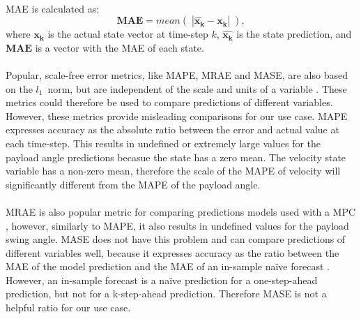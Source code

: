         \paragraph{}
        MAE is calculated as:
        \begin{equation}
            \bm{MAE} = mean \left( \phantom{.} \left\lvert \bm{\hat{x_k}} - \bm{x_k} \right\rvert \phantom{.} \right),
        \end{equation}
        where 
        $\bm{x_k}$ is the actual state vector at time-step $k$, 
        $\bm{\hat{x_k}}$ is the state prediction, 
        and 
        $\bm{MAE}$ is a vector with the MAE of each state.
        
        \paragraph{}
        Popular, scale-free error metrics, like MAPE, MRAE and MASE, are also based on the $l_1$~norm,
        but are independent of the scale and units of a variable \cite{Hyndman2006}.
        These metrics could therefore be used to compare predictions of different variables.
        However, these metrics provide misleading comparisons for our use case.
        MAPE expresses accuracy as the absolute ratio between the error and actual value at each time-step.
        This results in undefined or extremely large values for the payload angle predictions becasue the state has a zero mean.
        The velocity state variable has a non-zero mean, 
        therefore the scale of the MAPE of velocity will significantly different from the MAPE of the payload angle.
        
        \paragraph{}
        MRAE is also popular metric for comparing predictions models used with a MPC \cite{Kaiser2018b},
        however, similarly to MAPE, it also results in undefined values for the payload swing angle.
        MASE does not have this problem and can compare predictions of different variables well, 
        because it expresses accuracy as the ratio between the MAE of the model prediction and the MAE of an in-sample
        naïve forecast \cite{Hyndman2006}.
        However, an in-sample forecast is a naïve prediction for a one-step-ahead prediction, 
        but not for a k-step-ahead prediction.
        Therefore MASE is not a helpful ratio for our use case.

